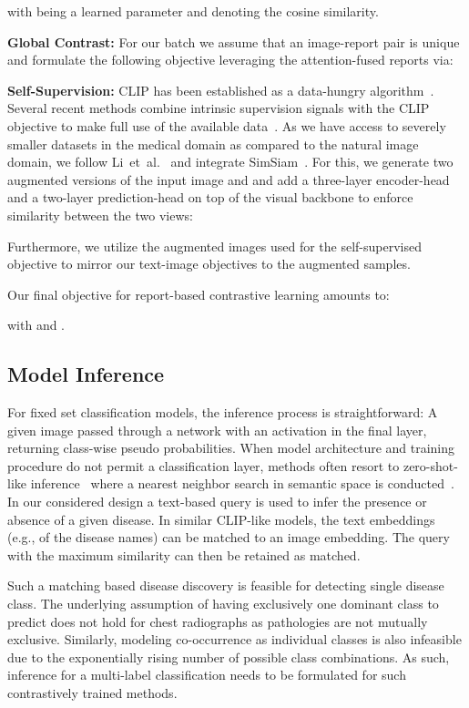 \documentclass[runningheads]{llncs}
\begin{document}
with  being a learned parameter and  denoting the cosine similarity.

\noindent\textbf{Global Contrast:} For our batch we assume that an image-report pair is unique and formulate the following objective leveraging the attention-fused  reports via: 


\noindent\textbf{Self-Supervision:} CLIP has been established as a data-hungry algorithm~\cite{radford2021learning,pham2021combined}. Several recent methods combine intrinsic supervision signals with the CLIP objective to make full use of the available data~\cite{li2021supervision,mu2021slip}. 
As we have access to severely smaller datasets in the medical domain as compared to the natural image domain, we follow Li~et~al.~\cite{li2021supervision} and integrate SimSiam~\cite{chen2021exploring}. For this, we generate two augmented versions of the input image  and  and add a three-layer encoder-head  and a two-layer prediction-head  on top of the visual backbone  to enforce similarity between the two views:

Furthermore, we utilize the augmented images used for the self-supervised objective to mirror our text-image objectives to the augmented samples. 


Our final objective for report-based contrastive learning amounts to: 

with  and .

\subsection{Model Inference}
For fixed set classification models, the inference process is straightforward: A given image  passed through a network with an activation in the final layer, returning class-wise pseudo probabilities. When model architecture and training procedure do not permit a classification layer, methods often resort to zero-shot-like inference~\cite{huang2021gloria,radford2021learning,wang2021self} where a nearest neighbor search in semantic space is conducted~\cite{frome2013devise}. 
In our considered design a text-based query is used to infer the presence or absence of a given disease. In similar CLIP-like models, the text embeddings (e.g., of the disease names) can be matched to an image embedding. The query with the maximum similarity can then be retained as matched.

Such a matching based disease discovery is feasible for detecting single disease class. The underlying assumption of having exclusively one dominant class to predict does not hold for chest radiographs as pathologies are not mutually exclusive. Similarly, modeling co-occurrence as individual classes is also infeasible due to the exponentially rising number of possible class combinations. As such, inference for a multi-label classification needs to be formulated for such contrastively trained methods.
\end{document}
